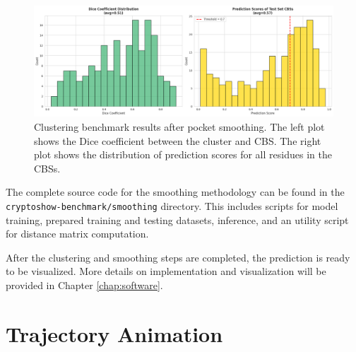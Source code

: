 \begin{figure}[htbp]
    \centering
    \includegraphics[width=\textwidth]{img/smoothened-2.png}
    \caption{Clustering benchmark results after pocket smoothing. The left plot shows the Dice coefficient between the cluster and CBS. The right plot shows the distribution of prediction scores for all residues in the CBSs.}
    \label{fig:clustering-benchmark-smoothened-dice}
\end{figure}

The complete source code for the smoothing methodology can be found in the \lstinline!cryptoshow-benchmark/smoothing! directory. This includes scripts for model training, prepared training and testing datasets, inference, and an utility script for distance matrix computation.

After the clustering and smoothing steps are completed, the prediction is ready to be visualized. More details on implementation and visualization will be provided in Chapter \ref{chap:software}.


\section{Trajectory Animation}
\label{sec:trajectory}

